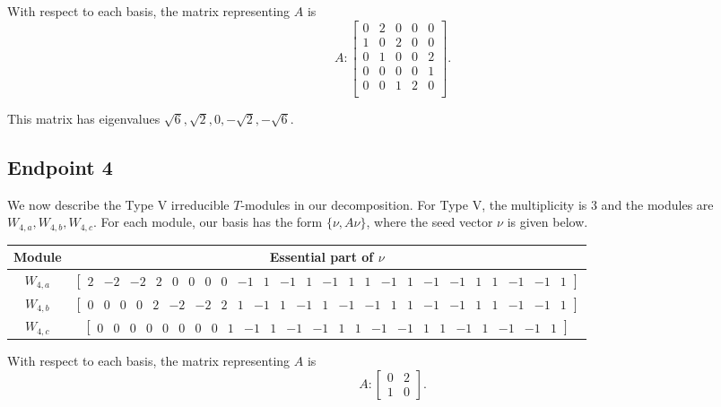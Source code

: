 \documentclass[12pt,letterpaper]{article}
\newcommand{\rowvector}[1]{\begin{bmatrix} #1 \end{bmatrix}}
\begin{document}
With respect to each basis, the matrix representing $A$ is 
\begin{equation}
    A: \begin{bmatrix}
  0 & 2 & 0 & 0 & 0 \\
  1 & 0 & 2 & 0 & 0 \\
  0 & 1 & 0 & 0 & 2 \\
  0 & 0 & 0 & 0 & 1 \\
  0 & 0 & 1 & 2 & 0 \\
\end{bmatrix}.
\label{eq:t12-IV}
\end{equation}

This matrix has eigenvalues $\sqrt{6}, \sqrt{2}, 0, -\sqrt{2}, -\sqrt{6}$.

\subsection{Endpoint 4}

We now describe the Type V irreducible $T$-modules in our decomposition. For Type V, the multiplicity is 3 and the modules are $W_{4,a},W_{4,b},W_{4,c}$. For each module, our basis has the form $\{\nu, A\nu\}$, where the seed vector $\nu$ is given below.
{
\setlength{\arraycolsep}{3pt}
\begin{center}
    \begin{tabular}{c | c}
    \toprule
       \textbf{Module}  & \textbf {Essential part of }$\nu$ \\
       \midrule
       $W_{4,a}$  & $\rowvector{2 & -2 & -2 & 2 & 0 & 0 & 0 & 0 & -1 & 1 & -1 & 1 & -1 & 1 & 1 & -1 & 1 & -1 & -1 & 1 & 1 & -1 & -1 & 1}$ \\[1.67pt]
       $W_{4,b}$  & $\rowvector{0 & 0 & 0 & 0 & 2 & -2 & -2 & 2 & 1 & -1 & 1 & -1 & 1 & -1 & -1 & 1 & 1 & -1 & -1 & 1 & 1 & -1 & -1 & 1}$ \\[1.67pt]
       $W_{4,c}$  & $\rowvector{0 & 0 & 0 & 0 & 0 & 0 & 0 & 0 & 1 & -1 & 1 & -1 & -1 & 1 & 1 & -1 & -1 & 1 & 1 & -1 & 1 & -1 & -1 & 1}$ \\
    \bottomrule
    \end{tabular}
\end{center}
}

With respect to each basis, the matrix representing $A$ is 
\begin{equation}
    A: \begin{bmatrix}
  0 & 2 \\
  1 & 0 \end{bmatrix}.
\label{eq:t12-V}
\end{equation}
\end{document}
